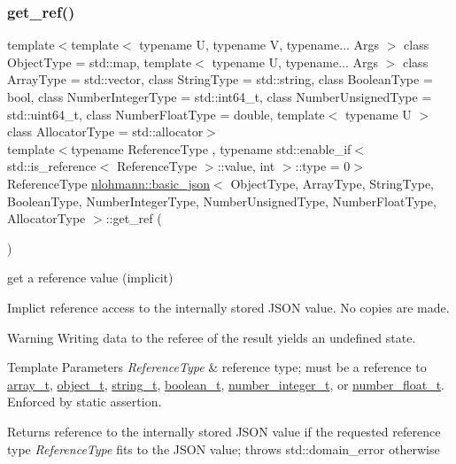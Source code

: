 \subsubsection{\texorpdfstring{get\+\_\+ref()}{get\_ref()}\hspace{0.1cm}{\footnotesize\ttfamily [1/2]}}
{\footnotesize\ttfamily template$<$template$<$ typename U, typename V, typename... Args $>$ class Object\+Type = std\+::map, template$<$ typename U, typename... Args $>$ class Array\+Type = std\+::vector, class String\+Type  = std\+::string, class Boolean\+Type  = bool, class Number\+Integer\+Type  = std\+::int64\+\_\+t, class Number\+Unsigned\+Type  = std\+::uint64\+\_\+t, class Number\+Float\+Type  = double, template$<$ typename U $>$ class Allocator\+Type = std\+::allocator$>$ \\
template$<$typename Reference\+Type , typename std\+::enable\+\_\+if$<$ std\+::is\+\_\+reference$<$ Reference\+Type $>$\+::value, int $>$\+::type  = 0$>$ \\
Reference\+Type \hyperlink{classnlohmann_1_1basic__json}{nlohmann\+::basic\+\_\+json}$<$ Object\+Type, Array\+Type, String\+Type, Boolean\+Type, Number\+Integer\+Type, Number\+Unsigned\+Type, Number\+Float\+Type, Allocator\+Type $>$\+::get\+\_\+ref (\begin{DoxyParamCaption}{ }\end{DoxyParamCaption})\hspace{0.3cm}{\ttfamily [inline]}}



get a reference value (implicit) 

Implict reference access to the internally stored J\+S\+ON value. No copies are made.

\begin{DoxyWarning}{Warning}
Writing data to the referee of the result yields an undefined state.
\end{DoxyWarning}

\begin{DoxyTemplParams}{Template Parameters}
{\em Reference\+Type} & reference type; must be a reference to \hyperlink{classnlohmann_1_1basic__json_ab00b882d39306d663c23dab110f5cae0}{array\+\_\+t}, \hyperlink{classnlohmann_1_1basic__json_a0ac9894c9de8dc551cf2e5f1c605537f}{object\+\_\+t}, \hyperlink{classnlohmann_1_1basic__json_ab63e618bbb0371042b1bec17f5891f42}{string\+\_\+t}, \hyperlink{classnlohmann_1_1basic__json_af3bc3e83aa162d7ba4df16a949872723}{boolean\+\_\+t}, \hyperlink{classnlohmann_1_1basic__json_ac4b10b2364f26ce47bdb9a413ff04a59}{number\+\_\+integer\+\_\+t}, or \hyperlink{classnlohmann_1_1basic__json_a74a0013e847fdc574b48f931f0e757e1}{number\+\_\+float\+\_\+t}. Enforced by static assertion.\\
\hline
\end{DoxyTemplParams}
\begin{DoxyReturn}{Returns}
reference to the internally stored J\+S\+ON value if the requested reference type {\itshape Reference\+Type} fits to the J\+S\+ON value; throws std\+::domain\+\_\+error otherwise
\end{DoxyReturn}

